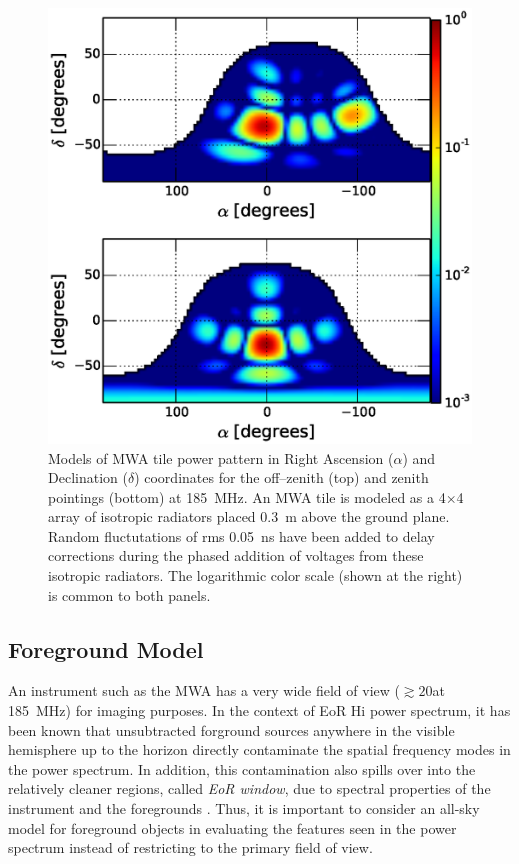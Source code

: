 \documentclass[preprint2,iop,numberedappendix]{emulateapj}
\begin{document}
\begin{figure}[htb]
\centering
\includegraphics[width=\linewidth]{figures/v1_0/delta_array_powerpattern_0.3m_ground_custom.eps}
\caption{Models of MWA tile power pattern in Right Ascension ($\alpha$) and Declination ($\delta$) coordinates for the off--zenith (top) and zenith pointings (bottom) at 185~MHz. An MWA tile is modeled as a 4$\times$4 array of isotropic radiators placed 0.3~m above the ground plane. Random fluctutations of rms 0.05~ns have been added to delay corrections during the phased addition of voltages from these isotropic radiators. The logarithmic color scale (shown at the right) is common to both panels. \label{fig:power_pattern}}
\end{figure}

\subsection{Foreground Model}\label{sec:foreground}

An instrument such as the MWA has a very wide field of view ($\gtrsim 20$\arcdeg at 185~MHz) for imaging purposes. In the context of EoR H{\sc i} power spectrum, it has been known that unsubtracted forground sources anywhere in the visible hemisphere up to the horizon directly contaminate the spatial frequency modes in the power spectrum. In addition, this contamination also spills over into the relatively cleaner regions, called {\it EoR window}, due to spectral properties of the instrument and the foregrounds \citep{thy13,pob13,ved12,par12}. Thus, it is important to consider an all-sky model for foreground objects in evaluating the features seen in the power spectrum instead of restricting to the primary field of view. 
\end{document}
